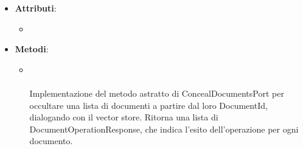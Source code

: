 \documentclass[10pt, a4paper]{article}
\begin{document}
\label{ConcealDocumentsVectorStoreDettaglio}
\begin{itemize}
    \item \textbf{Attributi}:
    \begin{itemize}
        \item 
    \end{itemize}
    \item \textbf{Metodi}:
    \begin{itemize}
        \item {}\\ \\
        Implementazione del metodo astratto di ConcealDocumentsPort per occultare una lista di documenti a partire dal loro DocumentId, dialogando con il vector store. Ritorna una lista di DocumentOperationResponse, che indica l'esito dell'operazione per ogni documento.
    \end{itemize}
\end{itemize}
\end{document}
